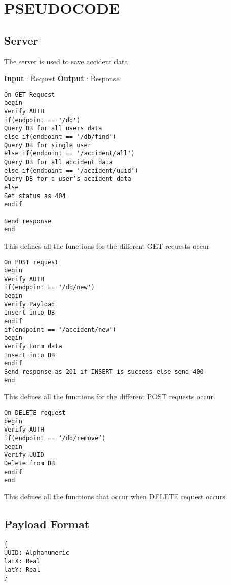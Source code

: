 \chapter{PSEUDOCODE} %

\section{Server}

The server is used to save accident data

\noindent\textbf{Input} : Request \newline
\textbf{Output} : Response

\begin{verbatim}
On GET Request
begin
Verify AUTH
if(endpoint == '/db')
Query DB for all users data
else if(endpoint == '/db/find')
Query DB for single user
else if(endpoint == '/accident/all')
Query DB for all accident data
else if(endpoint == '/accident/uuid')
Query DB for a user’s accident data
else
Set status as 404
endif

Send response
end
\end{verbatim}

This defines all the functions for the different GET requests occur

\begin{verbatim}
On POST request
begin
Verify AUTH
if(endpoint == '/db/new')
begin
Verify Payload
Insert into DB
endif
if(endpoint == '/accident/new')
begin
Verify Form data
Insert into DB
endif
Send response as 201 if INSERT is success else send 400
end	
\end{verbatim}

This defines all the functions for the different POST requests occur.

\begin{verbatim}
On DELETE request
begin 
Verify AUTH
if(endpoint == ‘/db/remove’)
begin
Verify UUID
Delete from DB
endif
end
\end{verbatim}

This defines all the functions that occur when DELETE request occurs.

\section{Payload Format}
\label{sub:payload}
\begin{verbatim}
{
UUID: Alphanumeric
latX: Real
latY: Real
}
\end{verbatim}